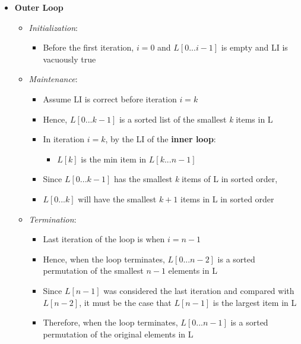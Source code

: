 \documentclass[10pt, 
a4paper, 
oneside, 
headinclude, footinclude, 
BCOR5mm]
{scrartcl}
\begin{document}
\begin{definition}
\begin{itemize}
\begin{itemize}
        \end{itemize}
        \item \textbf{Outer Loop}
        \begin{itemize}
            \item \textit{Initialization}:
            \begin{itemize}
                \item Before the first iteration, $i=0$ and $L[0...i-1]$ is empty and LI is vacuously true
            \end{itemize}
            \item \textit{Maintenance}:
            \begin{itemize}
                \item Assume LI is correct before iteration $i=k$
                \item Hence, $L[0...k-1]$ is a sorted list of the smallest \textit{k} items in L
                \item In iteration $i=k$, by the LI of the \textbf{inner loop}:
                \begin{itemize}
                    \item $L[k]$ is the min item in $L[k...n-1]$
                \end{itemize}
                \item Since $L[0...k-1]$ has the smallest \textit{k} items of L in sorted order,
                \item $L[0...k]$ will have the smallest $k+1$ items in L in sorted order
            \end{itemize}
            \item \textit{Termination}:
            \begin{itemize}
                \item Last iteration of the loop is when $i=n-1$
                \item Hence, when the loop terminates, $L[0...n-2]$ is a sorted permutation of the smallest $n-1$ elements in L
                \item Since $L[n-1]$ was considered the last iteration and compared with $L[n-2]$, it must be the case that $L[n-1]$ is the largest 
                item in L
                \item Therefore, when the loop terminates, $L[0...n-1]$ is a sorted permutation of the original elements in L
            \end{itemize}
        \end{itemize}
    \end{itemize}
\end{definition}
\newpage
\end{document}
